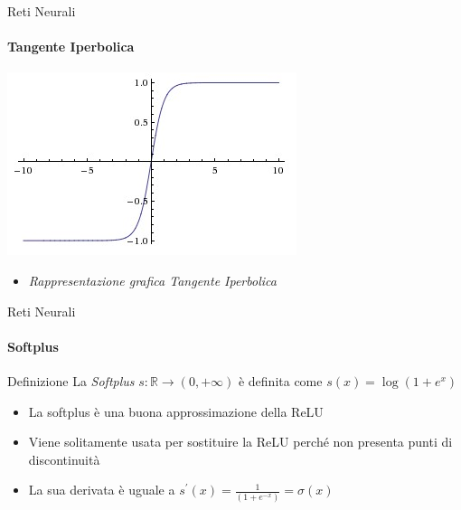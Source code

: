 \documentclass[
 ]{beamer}
\begin{document}
\begin{frame}{Reti Neurali}
    \framesubtitle{Tangente Iperbolica}
    
    \begin{center}
      \includegraphics[scale = 0.6]{tanh.jpeg}
    \end{center}
  
    \bigskip 
  
  \begin{itemize}
    \setlength\itemsep{1em}
    \item[] \large \emph{Rappresentazione grafica Tangente Iperbolica}
  \end{itemize}       
\end{frame} 

\begin{frame}{Reti Neurali}
    \framesubtitle{Softplus}
    \begin{block}{Definizione} 
        \large La \emph{Softplus} $s: \mathbb{R} \rightarrow (0, +\infty)$ è definita come $s(x) = \log(1 + e^x)$ 
    \end{block}\pause
    
    \bigskip
    
    \begin{itemize} [<+->]
        \setlength\itemsep{2em}
        \item \large La softplus è una buona approssimazione della ReLU
        \item \large Viene solitamente usata per sostituire la ReLU perché non presenta punti di discontinuità
        \item \large La sua derivata è uguale a $s^{\prime}(x) = \frac{1}{(1 + e^{-x})} = \sigma(x)$
    \end{itemize}
\end{frame}
\end{document}

